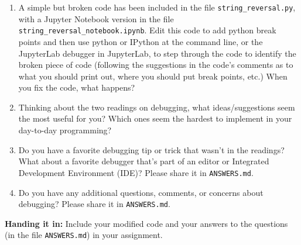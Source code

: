 \documentclass[10pt]{article}
\begin{document}
\begin{enumerate}

\item A simple but broken code has been included in the file
  \texttt{string\_reversal.py}, with a Jupyter Notebook version in the
  file \texttt{string\_reversal\_notebook.ipynb}.  Edit this code to add python break
  points and then use python or
  IPython at the command line, or the JupyterLab debugger in
  JupyterLab,
  to step through the code to identify the
  broken piece of code (following the suggestions in the code's
  comments as to what you should print out, where you should put break
  points, etc.)  When you fix the code, what happens?

\item Thinking about the two readings on debugging, what
  ideas/suggestions seem the most useful for you?  Which ones seem
  the hardest to implement in your day-to-day programming?  

\item Do you have a favorite debugging tip or trick that wasn't in the
  readings?  What about a favorite debugger that's part of an editor
  or Integrated Development Environment (IDE)?  Please share it in \texttt{ANSWERS.md}.

\item Do you have any additional questions, comments, or concerns
  about debugging?   Please share it in \texttt{ANSWERS.md}.

\end{enumerate}


\noindent \textbf{Handing it in:} Include your modified code and
your answers to the questions (in the file \texttt{ANSWERS.md})
in your assignment.
\end{document}
